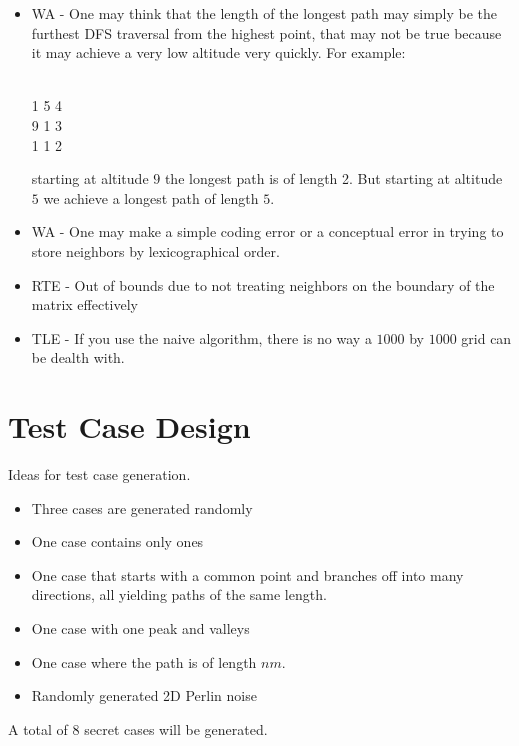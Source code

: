 \documentclass[a4paper,11pt]{article}
\begin{document}
\begin{itemize}
    \item WA - One may think that the length of the longest path may simply be the furthest DFS traversal from the highest point, that may not be true because it may achieve a very low altitude very quickly. For example:
    \begin{center}
     \begin{lstling} 
        \\
        1 5 4\\
        9 1 3 \\
        1 1 2 \\
        \end{lstling} 
    \end{center}
    starting at altitude $9$ the longest path is of length 2. But starting at altitude $5$ we achieve a longest path of length $5$.
    \item WA - One may make a simple coding error or a conceptual error in trying to store neighbors by lexicographical order.
    \item RTE - Out of bounds due to not treating neighbors on the boundary of the matrix effectively
    \item TLE - If you use the naive algorithm, there is no way a $1000$ by $1000$ grid can be dealth with.
    
\end{itemize}

\section{Test Case Design}

Ideas for test case generation.\\
\begin{itemize}
    \item Three cases are generated randomly
    \item One case contains only ones
    \item One case that starts with a common point and branches off into many directions, all yielding paths of the same length.
    \item One case with one peak and valleys
    \item One case where the path is of length $nm$.
    \item Randomly generated 2D Perlin noise
\end{itemize}

A total of $8$ secret cases will be generated.
\end{document}
